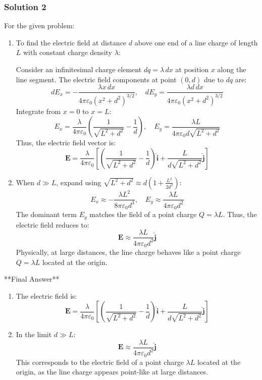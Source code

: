 \documentclass{article}
\begin{document}
\subsubsection{Solution 2}
For the given problem:

\begin{enumerate}
    \item To find the electric field at distance \( d \) above one end of a line charge of length \( L \) with constant charge density \( \lambda \):

    Consider an infinitesimal charge element \( dq = \lambda \, dx \) at position \( x \) along the line segment. The electric field components at point \( (0, d) \) due to \( dq \) are:
    \[
    dE_x = -\frac{\lambda x \, dx}{4\pi\varepsilon_0 (x^2 + d^2)^{3/2}}, \quad
    dE_y = \frac{\lambda d \, dx}{4\pi\varepsilon_0 (x^2 + d^2)^{3/2}}
    \]
    Integrate from \( x = 0 \) to \( x = L \):
    \[
    E_x = \frac{\lambda}{4\pi\varepsilon_0} \left( \frac{1}{\sqrt{L^2 + d^2}} - \frac{1}{d} \right), \quad
    E_y = \frac{\lambda L}{4\pi\varepsilon_0 d \sqrt{L^2 + d^2}}
    \]
    Thus, the electric field vector is:
    \[
    \mathbf{E} = \frac{\lambda}{4\pi\varepsilon_0} \left[ \left( \frac{1}{\sqrt{L^2 + d^2}} - \frac{1}{d} \right) \hat{\mathbf{i}} + \frac{L}{d\sqrt{L^2 + d^2}} \hat{\mathbf{j}} \right]
    \]

    \item When \( d \gg L \), expand using \( \sqrt{L^2 + d^2} \approx d \left( 1 + \frac{L^2}{2d^2} \right) \):
    \[
    E_x \approx -\frac{\lambda L^2}{8\pi\varepsilon_0 d^3}, \quad
    E_y \approx \frac{\lambda L}{4\pi\varepsilon_0 d^2}
    \]
    The dominant term \( E_y \) matches the field of a point charge \( Q = \lambda L \). Thus, the electric field reduces to:
    \[
    \mathbf{E} \approx \frac{\lambda L}{4\pi\varepsilon_0 d^2} \hat{\mathbf{j}}
    \]
    Physically, at large distances, the line charge behaves like a point charge \( Q = \lambda L \) located at the origin.
\end{enumerate}

**Final Answer**

\begin{enumerate}
    \item The electric field is:
    \[
    \boxed{\mathbf{E} = \frac{\lambda}{4\pi\varepsilon_0} \left[ \left( \frac{1}{\sqrt{L^2 + d^2}} - \frac{1}{d} \right) \hat{\mathbf{i}} + \frac{L}{d\sqrt{L^2 + d^2}} \hat{\mathbf{j}} \right]}
    \]
    
    \item In the limit \( d \gg L \):
    \[
    \boxed{\mathbf{E} \approx \frac{\lambda L}{4\pi\varepsilon_0 d^2} \hat{\mathbf{j}}}
    \]
    This corresponds to the electric field of a point charge \( \lambda L \) located at the origin, as the line charge appears point-like at large distances.
\end{enumerate}
\end{document}
